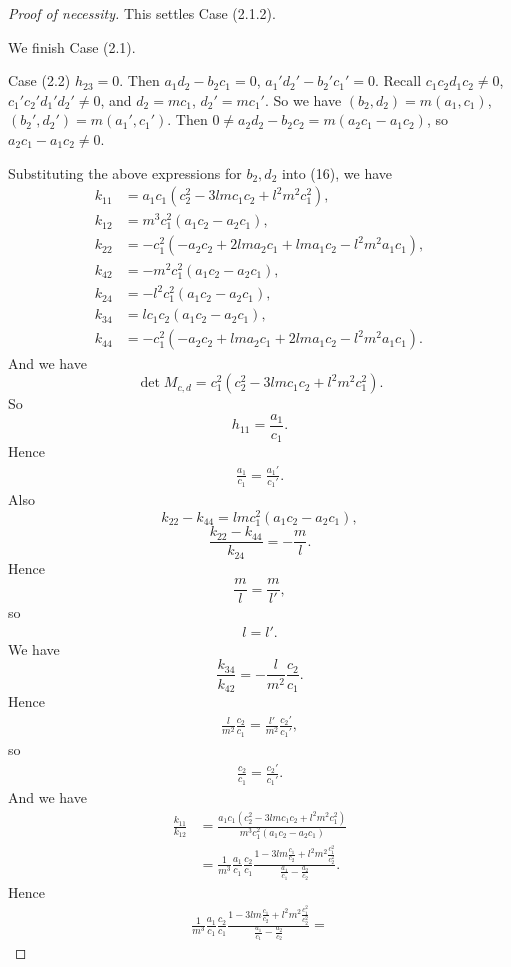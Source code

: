 \documentclass{article}
\begin{document}
\begin{proof}[Proof of necessity]
This settles Case (2.1.2).

We finish Case (2.1).


\medskip
Case (2.2) $h_{23}=0$. Then $a_1d_2-b_2c_1=0$, $a_1'd_2'-b_2'c_1'=0$.
Recall   
$c_1c_2d_1c_2\ne 0$, $c_1'c_2'd_1'd_2'\ne 0$, and
$d_2=m c_1$, $d_2'=m c_1'$.
So we have
$(b_2,d_2)=m(a_1,c_1)$, $(b_2',d_2')=m(a_1',c_1')$.
Then
$0\ne a_2d_2-b_2c_2=m(a_2c_1-a_1c_2)$, 
so
$a_2c_1-a_1c_2\ne 0$.

Substituting the above expressions for $b_2,d_2$ into (16), we have 
\begin{align*}
k_{11}&=a_1c_1(c_2^2-3lm c_1c_2+l^2m^2 c_1^2),\\
k_{12}&=m^3c_1^2(a_1c_2-a_2c_1),\\
k_{22}&=-c_1^2(-a_2c_2+2lm a_2c_1+lm a_1c_2-l^2m^2 a_1c_1),\\
k_{42}&=-m^2c_1^2(a_1c_2-a_2c_1),\\
k_{24}&=-l^2c_1^2(a_1c_2-a_2c_1),\\
k_{34}&=lc_1c_2(a_1c_2-a_2c_1),\\
k_{44}&=-c_1^2(-a_2c_2+lm a_2c_1+2lm a_1c_2-l^2m^2 a_1c_1).
\end{align*}
And we have
$$
\det M_{c,d}=c_1^2(c_2^2-3lm c_1c_2+l^2m^2 c_1^2).
$$
So
$$
h_{11}=\frac{a_1}{c_1}.
$$
Hence
\begin{align*}
\frac{a_1}{c_1}=\frac{a_1'}{c_1'}.\tag{33}
\end{align*}
Also
$$
k_{22}-k_{44}=lm c_1^2(a_1c_2-a_2c_1),
$$
$$
\frac{k_{22}-k_{44}}{k_{24}}=-\frac{m}{l}.
$$
Hence
$$
\frac{m}{l}=\frac{m}{l'},
$$
so
\begin{align*}
l=l'.\tag{34}
\end{align*}
We have
$$
\frac{k_{34}}{k_{42}}=-\frac{l}{m^2}\frac{c_2}{c_1}.
$$
Hence
\begin{align*}
\frac{l}{m^2}\frac{c_2}{c_1}=\frac{l'}{m^2}\frac{c_2'}{c_1'},
\end{align*}
so
\begin{align*}
\frac{c_2}{c_1}=\frac{c_2'}{c_1'}.\tag{35}
\end{align*}
And we have
\begin{align*}
\frac{k_{11}}{k_{12}}&=\frac{a_1c_1(c_2^2-3lm c_1c_2+l^2m^2 c_1^2)}
{m^3c_1^2(a_1c_2-a_2c_1)}\\
&=\frac{1}{m^3}\frac{a_1}{c_1}\frac{c_2}{c_1}\frac{1-3lm\frac{c_1}{c_2}+l^2m^2\frac{c_1^2}{c_2^2}}{\frac{a_1}{c_1}-\frac{a_2}{c_2}}.
\end{align*}
Hence
\begin{align*}
\frac{1}{m^3}\frac{a_1}{c_1}\frac{c_2}{c_1}\frac{1-3lm\frac{c_1}{c_2}+l^2m^2\frac{c_1^2}{c_2^2}}{\frac{a_1}{c_1}-\frac{a_2}{c_2}}=

\end{align*}
\end{proof}
\end{document}
